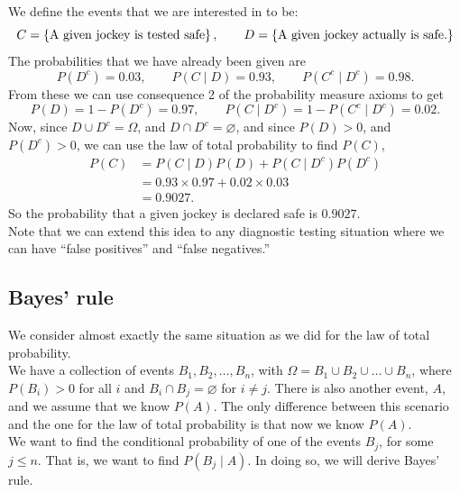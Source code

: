 \noindent We define the events that we are interested in to be:
\[
C = \left\{\text{A given jockey is tested safe}\right\}, \qquad D = \left\{\text{A given jockey actually is safe.}\right\}
\]
The probabilities that we have already been given are
\[
P(D^c) = 0.03, \qquad P(C \! \mid \! D) = 0.93, \qquad P(C^c \! \mid \! D^c) = 0.98.
\]
From these we can use consequence 2 of the probability measure axioms to get
\[
P(D) = 1 - P(D^c) = 0.97, \qquad P(C \! \mid \! D^c) = 1 - P(C^c \! \mid \! D^c) = 0.02.
\]
Now, since $D \cup D^c = \Omega$, and $D \cap D^c = \varnothing$, and since $P(D) > 0$, and $P(D^c) > 0$, we can use the law of total probability to find $P(C)$, 
\begin{align*}
P(C)  & = P(C \! \mid \! D)P(D) + P(C \! \mid \! D^c)P(D^c) \\
	& = 0.93\times 0.97 + 0.02 \times 0.03 \\
	& = 0.9027.
\end{align*}
So the probability that a given jockey is declared safe is $0.9027.$ \\

\noindent Note that we can extend this idea to any diagnostic testing situation where we can have ``false positives'' and ``false negatives.''

\subsection{Bayes' rule} \label{bayes rule}
We consider almost exactly the same situation as we did for the law of total probability. \\

\noindent We have a collection of events $B_1,B_2,\ldots,B_n$, with $\Omega = B_1 \cup B_2 \cup \ldots \cup B_n$, where $P(B_i) > 0$ for all $i$ and $B_i \cap B_j = \varnothing$ for $i \neq j$. There is also another event, $A$, and we assume that we know $P(A)$. The only difference between this scenario and the one for the law of total probability is that now we know $P(A).$ \\

\noindent We want to find the conditional probability of one of the events $B_j$, for some $j \leq n$. That is, we want to find $P(B_j \! \mid \! A)$. In doing so, we will derive Bayes' rule. \\

